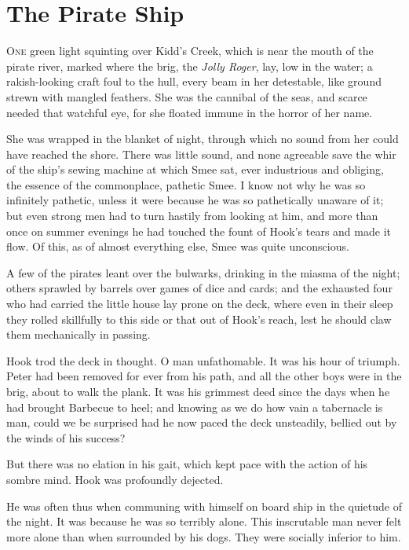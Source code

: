 \chapter{The Pirate Ship}

\lettrine{O}{ne} green light squinting over Kidd's Creek, which is near the mouth of
the pirate river, marked where the brig, the \emph{Jolly Roger}, lay, low in
the water; a rakish-looking craft foul to the hull, every beam in her
detestable, like ground strewn with mangled feathers. She was the
cannibal of the seas, and scarce needed that watchful eye, for she
floated immune in the horror of her name.

She was wrapped in the blanket of night, through which no sound from
her could have reached the shore. There was little sound, and none
agreeable save the whir of the ship's sewing machine at which Smee sat,
ever industrious and obliging, the essence of the commonplace, pathetic
Smee. I know not why he was so infinitely pathetic, unless it were
because he was so pathetically unaware of it; but even strong men had
to turn hastily from looking at him, and more than once on summer
evenings he had touched the fount of Hook's tears and made it flow. Of
this, as of almost everything else, Smee was quite unconscious.

A few of the pirates leant over the bulwarks, drinking in the miasma of
the night; others sprawled by barrels over games of dice and cards; and
the exhausted four who had carried the little house lay prone on the
deck, where even in their sleep they rolled skillfully to this side or
that out of Hook's reach, lest he should claw them mechanically in
passing.

Hook trod the deck in thought. O man unfathomable. It was his hour of
triumph. Peter had been removed for ever from his path, and all the
other boys were in the brig, about to walk the plank. It was his
grimmest deed since the days when he had brought Barbecue to heel; and
knowing as we do how vain a tabernacle is man, could we be surprised
had he now paced the deck unsteadily, bellied out by the winds of his
success?

But there was no elation in his gait, which kept pace with the action
of his sombre mind. Hook was profoundly dejected.

He was often thus when communing with himself on board ship in the
quietude of the night. It was because he was so terribly alone. This
inscrutable man never felt more alone than when surrounded by his dogs.
They were socially inferior to him.


